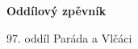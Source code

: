 \documentclass{article}
\begin{document}
\begin{titlepage}
   \begin{center}
       \vspace*{1cm}

       \textbf{\Huge{Oddílový zpěvník}}

       \vspace{0.5cm}
        \Large{97. oddíl Paráda a Vlčáci}
            
       \vspace{1.5cm}

       \vfill
            
            
   \end{center}
\end{titlepage}


\begin{songs}{}

\end{songs}
\end{document}
